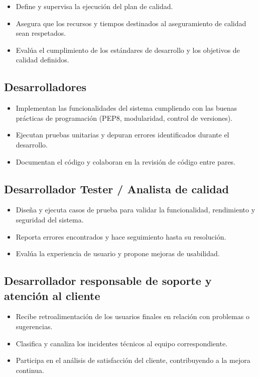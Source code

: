 \documentclass[12pt,a4paper]{article}
\begin{document}
\begin{itemize}
  \item Define y supervisa la ejecución del plan de calidad.
  \item Asegura que los recursos y tiempos destinados al aseguramiento de calidad sean
        respetados.
  \item Evalúa el cumplimiento de los estándares de desarrollo y los objetivos de calidad
        definidos.
\end{itemize}

\subsection{Desarrolladores}

\begin{itemize}
  \item Implementan las funcionalidades del sistema cumpliendo con las buenas prácticas de
        programación (PEP8, modularidad, control de versiones).
  \item Ejecutan pruebas unitarias y depuran errores identificados durante el desarrollo.
  \item Documentan el código y colaboran en la revisión de código entre pares.
\end{itemize}

\subsection{Desarrollador Tester / Analista de calidad}

\begin{itemize}
  \item Diseña y ejecuta casos de prueba para validar la funcionalidad, rendimiento y
        seguridad del sistema.
  \item Reporta errores encontrados y hace seguimiento hasta su resolución.
  \item Evalúa la experiencia de usuario y propone mejoras de usabilidad.
\end{itemize}

\subsection{Desarrollador responsable de soporte y atención al cliente}

\begin{itemize}
  \item Recibe retroalimentación de los usuarios finales en relación con problemas o
        sugerencias.
  \item Clasifica y canaliza los incidentes técnicos al equipo correspondiente.
  \item Participa en el análisis de satisfacción del cliente, contribuyendo a la mejora continua.
\end{itemize}
\end{document}
